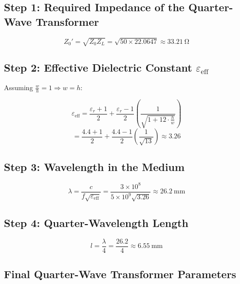 \documentclass[conference]{IEEEtran}
\begin{document}
\subsection*{Step 1: Required Impedance of the Quarter-Wave Transformer}

\begin{equation}
Z_0' = \sqrt{Z_0 Z_L} = \sqrt{50 \times 22.0647} \approx \SI{33.21}{\ohm}
\end{equation}

\subsection*{Step 2: Effective Dielectric Constant \( \varepsilon_{\text{eff}} \)}

Assuming \( \frac{w}{h} = 1 \Rightarrow w = h \):

\begin{equation}
\varepsilon_{\text{eff}} = \frac{\varepsilon_r + 1}{2} + \frac{\varepsilon_r - 1}{2} \left( \frac{1}{\sqrt{1 + 12 \cdot \frac{h}{w}}} \right) \end{equation}
\begin{equation}
= \frac{4.4 + 1}{2} + \frac{4.4 - 1}{2} \left( \frac{1}{\sqrt{13}} \right) \approx 3.26
\end{equation}

\subsection*{Step 3: Wavelength in the Medium}

\begin{equation}
\lambda = \frac{c}{f \sqrt{\varepsilon_{\text{eff}}}} 
= \frac{3 \times 10^8}{5 \times 10^9 \sqrt{3.26}} 
\approx \SI{26.2}{\milli\meter}
\end{equation}

\subsection*{Step 4: Quarter-Wavelength Length}

\begin{equation}
l = \frac{\lambda}{4} = \frac{26.2}{4} \approx \SI{6.55}{\milli\meter}
\end{equation}

\subsection*{Final Quarter-Wave Transformer Parameters}
\end{document}
